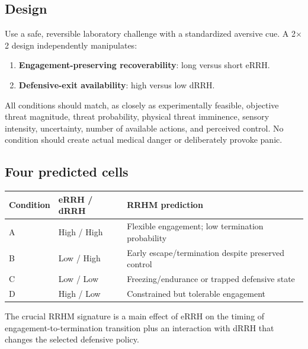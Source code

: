 \documentclass[10pt]{article}
\begin{document}
\subsection{Design}
Use a safe, reversible laboratory challenge with a standardized aversive cue. A 2$\times$2 design independently manipulates:
\begin{enumerate}[leftmargin=2em]
\item \textbf{Engagement-preserving recoverability}: long versus short eRRH.
\item \textbf{Defensive-exit availability}: high versus low dRRH.
\end{enumerate}
All conditions should match, as closely as experimentally feasible, objective threat magnitude, threat probability, physical threat imminence, sensory intensity, uncertainty, number of available actions, and perceived control. No condition should create actual medical danger or deliberately provoke panic.

\subsection{Four predicted cells}
\begin{center}
\begin{tabular}{lll}
\toprule
Condition & eRRH / dRRH & RRHM prediction \\
\midrule
A & High / High & Flexible engagement; low termination probability \\
B & Low / High & Early escape/termination despite preserved control \\
C & Low / Low & Freezing/endurance or trapped defensive state \\
D & High / Low & Constrained but tolerable engagement \\
\bottomrule
\end{tabular}
\end{center}

The crucial RRHM signature is a main effect of eRRH on the timing of engagement-to-termination transition plus an interaction with dRRH that changes the selected defensive policy.
\end{document}
